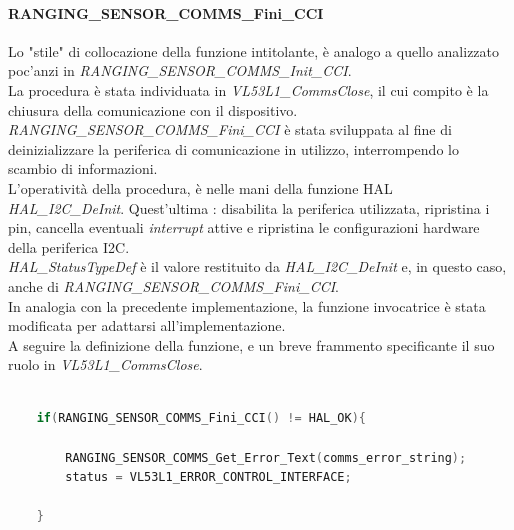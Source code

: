 \documentclass[11pt]{report}
\begin{document}
\paragraph{RANGING\_SENSOR\_COMMS\_Fini\_CCI}
Lo "stile" di collocazione della funzione intitolante, è analogo a quello analizzato poc'anzi in \textit{RANGING\_SENSOR\_COMMS\_Init\_CCI}.\\
La procedura è stata individuata in \textit{VL53L1\_CommsClose}, il cui compito è la chiusura della comunicazione con il dispositivo.\\
\textit{RANGING\_SENSOR\_COMMS\_Fini\_CCI} è stata sviluppata al fine di deinizializzare la periferica di comunicazione in utilizzo, interrompendo lo scambio di informazioni.\\
L'operatività della procedura, è nelle mani della funzione HAL \textit{HAL\_I2C\_DeInit}. Quest'ultima : disabilita la periferica utilizzata, ripristina i pin, cancella eventuali \textit{interrupt} attive e ripristina le configurazioni hardware della periferica I2C.\\
\textit{HAL\_StatusTypeDef} è il valore restituito da \textit{HAL\_I2C\_DeInit} e, in questo caso, anche di \textit{RANGING\_SENSOR\_COMMS\_Fini\_CCI}.\\
In analogia con la precedente implementazione, la funzione invocatrice è stata modificata per adattarsi all'implementazione.\\
A seguire la definizione della funzione, e un breve frammento specificante il suo ruolo in \textit{VL53L1\_CommsClose}.

\begin{lstlisting}[language=Cpp, caption={Dettaglio sull'invocazione di \textit{RANGING\_SENSOR\_COMMS\_Fini\_CCI} in \textit{VL53L1\_CommsClose}}]
    
    if(RANGING_SENSOR_COMMS_Fini_CCI() != HAL_OK){

        RANGING_SENSOR_COMMS_Get_Error_Text(comms_error_string);
        status = VL53L1_ERROR_CONTROL_INTERFACE;

    }
\end{lstlisting}
\end{document}
